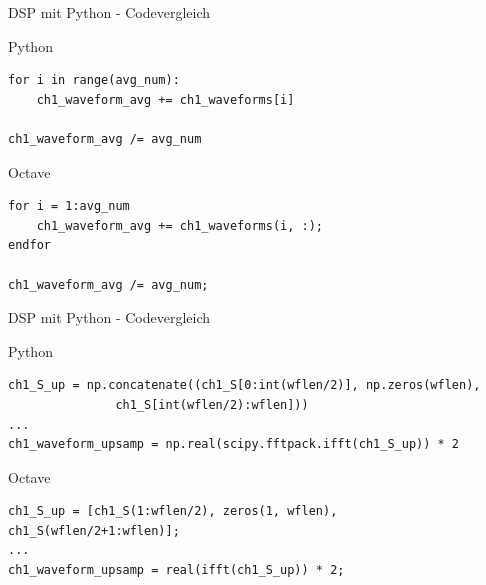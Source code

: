 \documentclass[8pt]{beamer}
\begin{document}
\begin{frame}[fragile,label={sec:orgf47ca15}]{DSP mit Python - Codevergleich}
 \begin{block}{Python}
\begin{verbatim}
for i in range(avg_num):
    ch1_waveform_avg += ch1_waveforms[i]

ch1_waveform_avg /= avg_num
\end{verbatim}
\end{block}
\begin{block}{Octave}
\begin{verbatim}
for i = 1:avg_num
    ch1_waveform_avg += ch1_waveforms(i, :);
endfor

ch1_waveform_avg /= avg_num;
\end{verbatim}
\end{block}
\end{frame}


\begin{frame}[fragile,label={sec:org0826dcb}]{DSP mit Python - Codevergleich}
 \begin{block}{Python}
\begin{verbatim}
ch1_S_up = np.concatenate((ch1_S[0:int(wflen/2)], np.zeros(wflen), 
			   ch1_S[int(wflen/2):wflen]))
...
ch1_waveform_upsamp = np.real(scipy.fftpack.ifft(ch1_S_up)) * 2
\end{verbatim}
\end{block}
\begin{block}{Octave}
\begin{verbatim}
ch1_S_up = [ch1_S(1:wflen/2), zeros(1, wflen), ch1_S(wflen/2+1:wflen)];
...
ch1_waveform_upsamp = real(ifft(ch1_S_up)) * 2;
\end{verbatim}
\end{block}
\end{frame}
\end{document}
